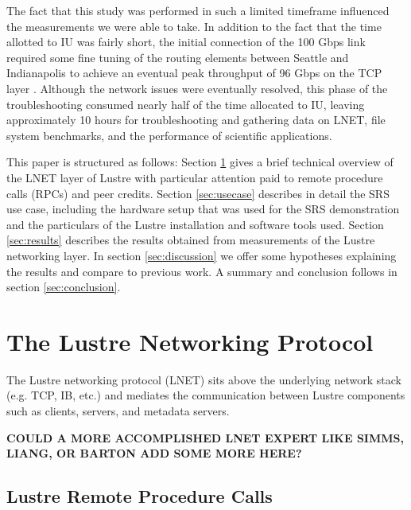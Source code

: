 \documentclass[]{sigplan-proc}
\begin{document}
The fact that this study was performed in such a limited timeframe influenced the measurements we were able to
take. In addition to the fact that the time allotted to IU was fairly short, the initial connection of the 100
Gbps link required some fine tuning of the routing elements between Seattle and Indianapolis to achieve an
eventual peak throughput of 96 Gbps on the TCP layer \cite{henschel2012}. Although the network issues were
eventually resolved, this phase of the troubleshooting consumed nearly half of the time allocated to IU,
leaving approximately 10 hours for troubleshooting and gathering data on LNET, file system benchmarks, and the
performance of  scientific applications.

This paper is structured as follows: Section \ref{sec:LNET} gives a brief technical overview of the LNET layer
of Lustre with particular attention paid to remote procedure calls (RPCs) and peer credits. Section
\ref{sec:usecase} describes in detail the SRS use case, including the hardware setup that was used for the SRS
demonstration and the particulars of the Lustre installation and software tools used. Section
\ref{sec:results} describes the results obtained from measurements of the Lustre networking layer. In section
\ref{sec:discussion} we offer some hypotheses explaining the results and compare to previous work. A summary and conclusion follows in section \ref{sec:conclusion}.

\section{The Lustre Networking Protocol}\label{sec:LNET}

The Lustre networking protocol (LNET) sits above the underlying network stack (e.g. TCP, IB, etc.) and
mediates the communication between Lustre components such as clients, servers, and metadata servers. 

{\bf COULD A MORE ACCOMPLISHED LNET EXPERT LIKE SIMMS, LIANG, OR BARTON ADD SOME MORE HERE?}

\subsection{Lustre Remote Procedure Calls}
\end{document}
